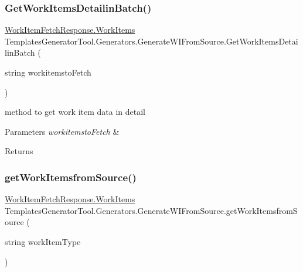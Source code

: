 \subsubsection{\texorpdfstring{Get\+Work\+Items\+Detailin\+Batch()}{GetWorkItemsDetailinBatch()}}
{\footnotesize\ttfamily \mbox{\hyperlink{class_templates_generator_tool_1_1_view_model_1_1_work_item_fetch_response_1_1_work_items}{Work\+Item\+Fetch\+Response.\+Work\+Items}} Templates\+Generator\+Tool.\+Generators.\+Generate\+W\+I\+From\+Source.\+Get\+Work\+Items\+Detailin\+Batch (\begin{DoxyParamCaption}\item[{string}]{workitemsto\+Fetch }\end{DoxyParamCaption})}



method to get work item data in detail 


\begin{DoxyParams}{Parameters}
{\em workitemsto\+Fetch} & \\
\hline
\end{DoxyParams}
\begin{DoxyReturn}{Returns}

\end{DoxyReturn}
\mbox{\label{class_templates_generator_tool_1_1_generators_1_1_generate_w_i_from_source_a99040ad4f9108c0ca4d1b9ab8edbdc62}} 
\subsubsection{\texorpdfstring{get\+Work\+Itemsfrom\+Source()}{getWorkItemsfromSource()}}
{\footnotesize\ttfamily \mbox{\hyperlink{class_templates_generator_tool_1_1_view_model_1_1_work_item_fetch_response_1_1_work_items}{Work\+Item\+Fetch\+Response.\+Work\+Items}} Templates\+Generator\+Tool.\+Generators.\+Generate\+W\+I\+From\+Source.\+get\+Work\+Itemsfrom\+Source (\begin{DoxyParamCaption}\item[{string}]{work\+Item\+Type }\end{DoxyParamCaption})}




